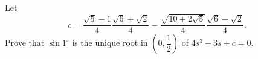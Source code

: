 Let
\[c=\dfrac{\sqrt5-1}{4}\dfrac{\sqrt6+\sqrt2}{4}-\dfrac{\sqrt{10+2\sqrt5}}{4}\dfrac{\sqrt6-\sqrt2}{4}.\]
Prove that $\sin1^\circ$ is the unique root in $(0,\dfrac{1}{2})$ of $4s^3-3s+c=0$.
